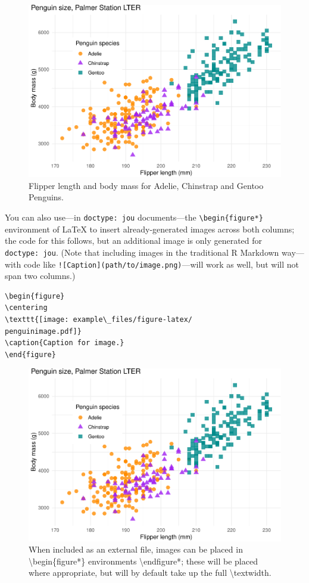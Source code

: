 \documentclass[jou]{apa7}
\begin{document}
\begin{figure}
\includegraphics[width=1\linewidth]{example_files/figure-latex/penguinimage-1} \caption{Flipper length and body mass for Adelie, Chinstrap and Gentoo Penguins.}\label{fig:penguinimage}
\end{figure}

You can also use---in \texttt{doctype:\ jou} documents---the
\texttt{\textbackslash{}begin\{figure*\}} environment of LaTeX to insert
already-generated images across both columns; the code for this follows,
but an additional image is only generated for \texttt{doctype:\ jou}.
(Note that including images in the traditional R Markdown way---with
code like \texttt{!{[}Caption{]}(path/to/image.png)}---will work as
well, but will not span two columns.)

\begin{verbatim}
\begin{figure}
\centering
\texttt{[image: example\_files/figure-latex/
penguinimage.pdf]}
\caption{Caption for image.}
\end{figure}
\end{verbatim}

\begin{figure}
\centering
\includegraphics{example_files/figure-latex/penguinimage.pdf}
\caption{When included as an external file, images can be placed in \textbackslash{}begin\{figure*\} environments \textbackslash{}end{figure*}; these will be placed where appropriate, but will by default take up the full \textbackslash{}textwidth.}
\end{figure}
\end{document}
